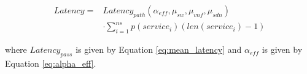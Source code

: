 \begin{equation}
\label{eq:latency_eff}
\begin{split}
Latency = & Latency_{path}(\alpha_{eff}, \mu_{sw}, \mu_{vnf}, \mu_{sdn}) \\
			  &\cdot \sum_{i=1}^{ns} p(service_i) (len(service_i) - 1)
\end{split}
\end{equation}

where $Latency_{pass}$ is given by Equation \ref{eq:mean_latency} and $\alpha_{eff}$ is given by Equation \ref{eq:alpha_eff}.

\vspace{0mm} %